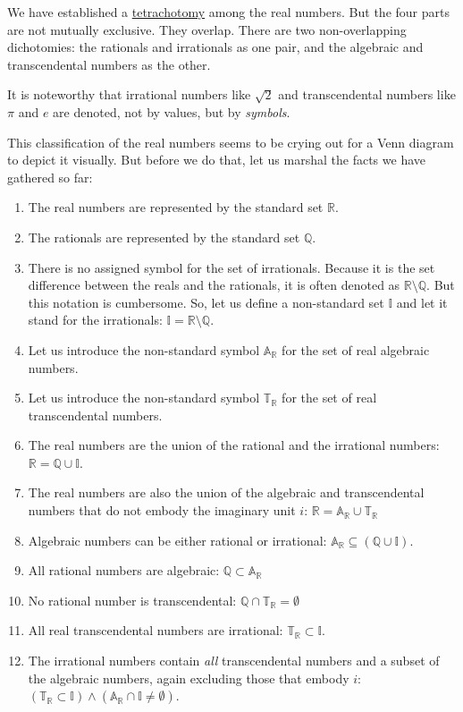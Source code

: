 \documentclass[
  a4paper,
]{article}
\begin{document}
We have established a
\href{https://www.collinsdictionary.com/dictionary/english/tetrachotomy}{tetrachotomy}
among the real numbers. But the four parts are not mutually exclusive.
They overlap. There are two non-overlapping dichotomies: the rationals
and irrationals as one pair, and the algebraic and transcendental
numbers as the other.

It is noteworthy that irrational numbers like \(\sqrt{2}\) and
transcendental numbers like \(\pi\) and \(e\) are denoted, not by
values, but by \emph{symbols}.

This classification of the real numbers seems to be crying out for a
Venn diagram to depict it visually. But before we do that, let us
marshal the facts we have gathered so far:

\begin{enumerate}
\item
  The real numbers are represented by the standard set \(\mathbb{R}\).
\item
  The rationals are represented by the standard set \(\mathbb{Q}\).
\item
  There is no assigned symbol for the set of irrationals. Because it is
  the set difference between the reals and the rationals, it is often
  denoted as \(\mathbb{R}\setminus\mathbb{Q}\). But this notation is
  cumbersome. So, let us define a non-standard set \(\mathbb{I}\) and
  let it stand for the irrationals:
  \(\mathbb{I} = \mathbb{R}\setminus\mathbb{Q}\).
\item
  Let us introduce the non-standard symbol \(\mathbb{A_{\mathbb{R}}}\)
  for the set of real algebraic numbers.
\item
  Let us introduce the non-standard symbol \(\mathbb{T_{\mathbb{R}}}\)
  for the set of real transcendental numbers.
\item
  The real numbers are the union of the rational and the irrational
  numbers: \(\mathbb{R} = \mathbb{Q} \cup \mathbb{I}\).
\item
  The real numbers are also the union of the algebraic and
  transcendental numbers that do not embody the imaginary unit \(i\):
  \(\mathbb{R} = \mathbb{A_{\mathbb{R}}} \cup \mathbb{T_{\mathbb{R}}}\)
\item
  Algebraic numbers can be either rational or irrational:
  \(\mathbb{A_{\mathbb{R}}} \subseteq (\mathbb{Q} \cup \mathbb{I})\).
\item
  All rational numbers are algebraic:
  \(\mathbb{Q} \subset \mathbb{A_{\mathbb{R}}}\)
\item
  No rational number is transcendental:
  \(\mathbb{Q} \cap \mathbb{T_{\mathbb{R}}} = \emptyset\)
\item
  All real transcendental numbers are irrational:
  \(\mathbb{T_{\mathbb{R}}} \subset \mathbb{I}\).
\item
  The irrational numbers contain \emph{all} transcendental numbers and a
  subset of the algebraic numbers, again excluding those that embody
  \(i\):
  \((\mathbb{T_{\mathbb{R}}} \subset \mathbb{I}) \wedge (\mathbb{A}_{\mathbb{R}} \cap \mathbb{I} \neq \emptyset)\).
\end{enumerate}
\end{document}
